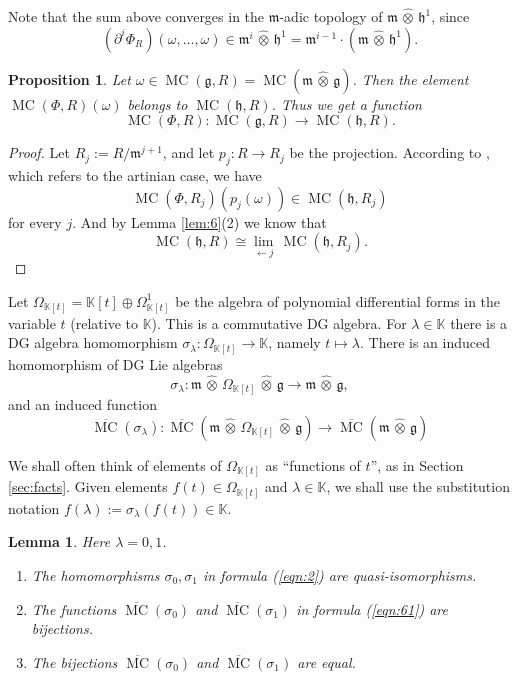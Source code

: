 \documentclass[a4paper,10pt]{amsart}
\newtheorem{prop}[equation]{Proposition}
\newtheorem{lem}[equation]{Lemma}
\theoremstyle{definition}
\numberwithin{equation}{section}
\newcommand{\opn}{\operatorname}
\newcommand{\ol}{\overline}
\newcommand{\mfrak}[1]{\mathfrak{#1}}
\newcommand{\mbb}[1]{\mathbb{#1}}
\newcommand{\tup}[1]{\textup{#1}}
\newcommand{\what}[1]{\widehat{#1}}
\newcommand{\hatotimes}{\, \what{\otimes} \,}
\newcommand{\hot}{\hatotimes}
\newcommand{\K}{\mbb{K}}
\newcommand{\g}{\mfrak{g}}
\newcommand{\m}{\mfrak{m}}
\newcommand{\h}{\mfrak{h}}
\newcommand{\sg}{\sigma}
\newcommand{\om}{\omega}
\newcommand{\Om}{\Omega}
\newcommand{\la}{\lambda}
\begin{document}
Note that the sum above converges in the $\m$-adic topology of 
$\m \hot \h^1$, since 
\[ (\partial^i \Phi_{R})(\om, \ldots, \om)
\in \m^i \hot \h^1 = \m^{i-1} \cdot (\m \hot \h^1) . \]

\begin{prop} \label{prop:4}
Let 
$\om \in \opn{MC}(\g, R) = \opn{MC}(\m \hot \g)$.
Then the element
$\opn{MC}(\Phi, R)(\om)$ belongs to $\opn{MC}(\h, R)$.
Thus we get a function 
\[ \opn{MC}(\Phi, R) : \opn{MC}(\g, R) \to \opn{MC}(\h, R) . \]
\end{prop}

\begin{proof}
Let $R_j := R / \m^{j+1}$, and let $p_j : R \to R_j$ be the projection.
According to \cite[Theorem 3.21]{Ye2}, which refers to the artinian case, we
have
\[ \opn{MC}(\Phi, R_j)(p_j(\om)) \in \opn{MC}(\h , R_j) \]
for every $j$. And by Lemma \ref{lem:6}(2) we know that 
\[ \opn{MC}(\h, R) \cong 
\lim_{\leftarrow j}\, \opn{MC}(\h, R_j) . \]
\end{proof}

Let $\Om_{\K[t]} = \K[t] \oplus \Om^1_{\K[t]}$ be the algebra of polynomial
differential forms
in the variable $t$ (relative to $\K$). This is a commutative DG
algebra. For $\la \in \K$ there is a DG algebra homomorphism
$\sg_{\la} : \Om_{\K[t]} \to \K$, namely $t \mapsto \la$.
There is an induced homomorphism of DG Lie algebras 
\begin{equation} \label{eqn:2}
\sg_{\la}  :  \m \hatotimes \Om_{\K[t]} \hatotimes \g \to 
\m \hatotimes \g ,
\end{equation}
and an induced function
\begin{equation} \label{eqn:61}
\ol{\opn{MC}}(\sg_{\la}) : 
\ol{\opn{MC}} ( \m \hatotimes \Om_{\K[t]} \hatotimes \g) 
\to \ol{\opn{MC}}(\m \hatotimes \g) 
\end{equation}

We shall often think of elements of $\Om_{\K[t]}$ as 
``functions of $t$'', as in Section \ref{sec:facts}. Given elements
$f(t) \in \Om_{\K[t]}$ and $\la \in \K$,
we shall use the substitution notation  
$f(\la) := \sg_{\la} (f(t)) \in \K$.

\begin{lem} \label{lem:16}
Here $\lambda = 0, 1$. 
\begin{enumerate}
\item The homomorphisms $\sg_0, \sg_1$ in formula \tup{(\ref{eqn:2})}
are quasi-iso\-morphisms.

\item The functions $\ol{\opn{MC}}(\sg_0)$ and $\ol{\opn{MC}}(\sg_1)$
in formula \tup{(\ref{eqn:61})} are bijections.

\item The bijections 
$\ol{\opn{MC}}(\sg_0)$ and $\ol{\opn{MC}}(\sg_1)$ are equal.
\end{enumerate} 
\end{lem}
\end{document}

